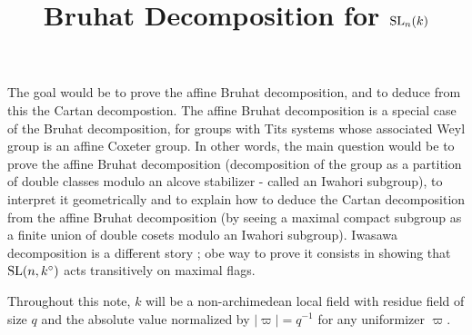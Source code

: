 \documentclass{article}
\title{Bruhat Decomposition for \texorpdfstring{$\operatorname{SL}_n(k)$}{SLn(k)}}
\author{}
\begin{document}
\maketitle

The goal would be to prove the affine Bruhat decomposition, and to deduce from this the Cartan decompostion. The affine Bruhat decomposition is a special case of the Bruhat decomposition, for groups with Tits systems whose associated Weyl group is an affine Coxeter group. In other words, the main question would be to prove the affine Bruhat decomposition (decomposition of the group as a partition of double classes modulo an alcove stabilizer - called an Iwahori subgroup), to interpret it geometrically and to explain how to deduce the Cartan decomposition from the affine Bruhat decomposition (by seeing a maximal compact subgroup as a finite union of double cosets modulo an Iwahori subgroup). Iwasawa decomposition is a different story ; obe way to prove it consists in showing that $\operatorname{SL}(n,k^\circ)$ acts transitively on maximal flags. 

Throughout this note, $k$ will be a non-archimedean local field with residue field of size $q$ and the absolute value normalized by $|\varpi| = q^{-1}$ for any uniformizer $\varpi$.
\end{document}
